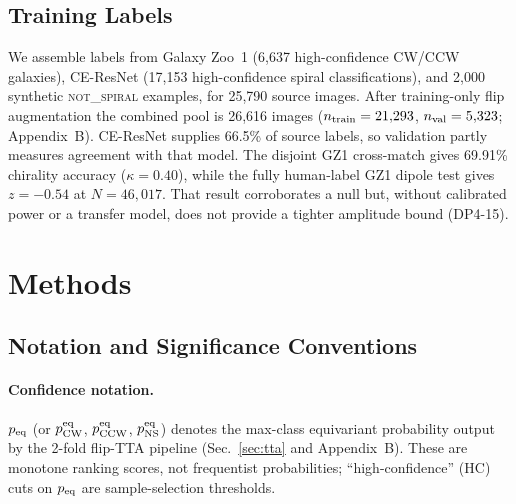 \documentclass[aps,prd,twocolumn,superscriptaddress,preprintnumbers,nofootinbib,longbibliography,floatfix]{revtex4-2}
\newcommand{\NS}{\textsc{not\_spiral}}
\begin{document}
\subsection{Training Labels}

We assemble labels from Galaxy Zoo~1 (6,637 high-confidence CW/CCW galaxies), CE-ResNet (17,153 high-confidence spiral classifications), and 2,000 synthetic \NS{} examples, for 25,790 source images. After training-only flip augmentation the combined pool is 26,616 images ($n_{\rm train}=21{,}293$, $n_{\rm val}=5{,}323$; Appendix~B). CE-ResNet supplies 66.5\% of source labels, so validation partly measures agreement with that model. The disjoint GZ1 cross-match gives 69.91\% chirality accuracy ($\kappa=0.40$), while the fully human-label GZ1 dipole test gives $z=-0.54$ at $N=46{,}017$. That result corroborates a null but, without calibrated power or a transfer model, does not provide a tighter amplitude bound (DP4-15).

\section{Methods}
\label{sec:methods}

\subsection{Notation and Significance Conventions}
\label{sec:notation}

\paragraph{Confidence notation.}
$p_{\rm eq}$ (or $p_{\rm CW}^{\rm eq}$, $p_{\rm CCW}^{\rm eq}$, $p_{\rm NS}^{\rm eq}$) denotes the max-class equivariant probability output by the 2-fold flip-TTA pipeline (Sec.~\ref{sec:tta} and Appendix~B). These are monotone ranking scores, not frequentist probabilities; ``high-confidence'' (HC) cuts on $p_{\rm eq}$ are sample-selection thresholds.
\end{document}
